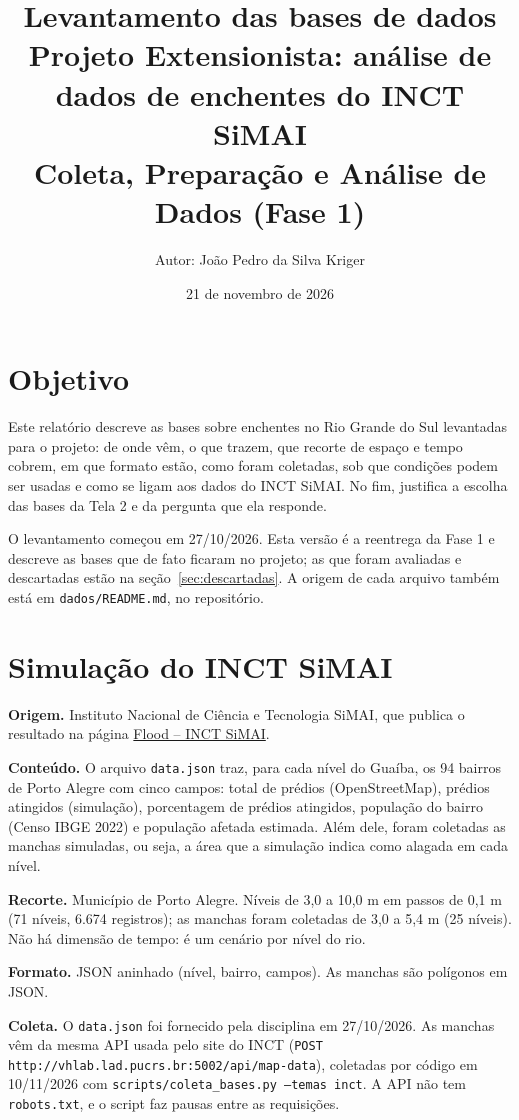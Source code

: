 \documentclass[11pt,a4paper]{article}
\title{\textbf{Levantamento das bases de dados}\\[0.3em]\large Projeto Extensionista: análise de dados de enchentes do INCT SiMAI\\Coleta, Preparação e Análise de Dados (Fase 1)}
\author{Autor: João Pedro da Silva Kriger}
\date{21 de novembro de 2026}
\newcommand{\campo}[1]{\texttt{#1}}
\begin{document}
\maketitle

\section{Objetivo}

Este relatório descreve as bases sobre enchentes no Rio Grande do Sul levantadas para o projeto: de onde vêm, o que trazem, que recorte de espaço e tempo cobrem, em que formato estão, como foram coletadas, sob que condições podem ser usadas e como se ligam aos dados do INCT SiMAI. No fim, justifica a escolha das bases da Tela 2 e da pergunta que ela responde.

O levantamento começou em 27/10/2026. Esta versão é a reentrega da Fase 1 e descreve as bases que de fato ficaram no projeto; as que foram avaliadas e descartadas estão na seção~\ref{sec:descartadas}. A origem de cada arquivo também está em \campo{dados/README.md}, no repositório.

\section{Simulação do INCT SiMAI}

\textbf{Origem.} Instituto Nacional de Ciência e Tecnologia SiMAI, que publica o resultado na página \href{http://vhlab.com.br/INCT/floods/}{Flood -- INCT SiMAI}.

\textbf{Conteúdo.} O arquivo \campo{data.json} traz, para cada nível do Guaíba, os 94 bairros de Porto Alegre com cinco campos: total de prédios (OpenStreetMap), prédios atingidos (simulação), porcentagem de prédios atingidos, população do bairro (Censo IBGE 2022) e população afetada estimada. Além dele, foram coletadas as manchas simuladas, ou seja, a área que a simulação indica como alagada em cada nível.

\textbf{Recorte.} Município de Porto Alegre. Níveis de 3,0 a 10,0 m em passos de 0,1 m (71 níveis, 6.674 registros); as manchas foram coletadas de 3,0 a 5,4 m (25 níveis). Não há dimensão de tempo: é um cenário por nível do rio.

\textbf{Formato.} JSON aninhado (nível, bairro, campos). As manchas são polígonos em JSON.

\textbf{Coleta.} O \campo{data.json} foi fornecido pela disciplina em 27/10/2026. As manchas vêm da mesma API usada pelo site do INCT (\campo{POST http://vhlab.lad.pucrs.br:5002/api/map-data}), coletadas por código em 10/11/2026 com \campo{scripts/coleta\_bases.py --temas inct}. A API não tem \campo{robots.txt}, e o script faz pausas entre as requisições.
\end{document}
